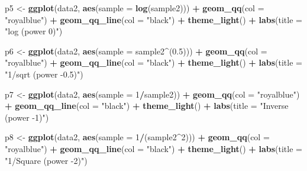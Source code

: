 \documentclass[
]{book}
\newenvironment{Shaded}{\begin{snugshade}}{\end{snugshade}}
\newcommand{\DataTypeTok}[1]{\textcolor[rgb]{0.13,0.29,0.53}{#1}}
\newcommand{\DecValTok}[1]{\textcolor[rgb]{0.00,0.00,0.81}{#1}}
\newcommand{\FloatTok}[1]{\textcolor[rgb]{0.00,0.00,0.81}{#1}}
\newcommand{\KeywordTok}[1]{\textcolor[rgb]{0.13,0.29,0.53}{\textbf{#1}}}
\newcommand{\NormalTok}[1]{#1}
\newcommand{\OperatorTok}[1]{\textcolor[rgb]{0.81,0.36,0.00}{\textbf{#1}}}
\newcommand{\StringTok}[1]{\textcolor[rgb]{0.31,0.60,0.02}{#1}}
\begin{document}
\begin{Shaded}
\begin{Highlighting}[]
\NormalTok{p5 <-}\StringTok{ }\KeywordTok{ggplot}\NormalTok{(data2, }\KeywordTok{aes}\NormalTok{(}\DataTypeTok{sample =} \KeywordTok{log}\NormalTok{(sample2))) }\OperatorTok{+}
\StringTok{    }\KeywordTok{geom_qq}\NormalTok{(}\DataTypeTok{col =} \StringTok{"royalblue"}\NormalTok{) }\OperatorTok{+}\StringTok{ }
\StringTok{    }\KeywordTok{geom_qq_line}\NormalTok{(}\DataTypeTok{col =} \StringTok{"black"}\NormalTok{) }\OperatorTok{+}
\StringTok{    }\KeywordTok{theme_light}\NormalTok{() }\OperatorTok{+}
\StringTok{    }\KeywordTok{labs}\NormalTok{(}\DataTypeTok{title =} \StringTok{"log (power 0)"}\NormalTok{)}

\NormalTok{p6 <-}\StringTok{ }\KeywordTok{ggplot}\NormalTok{(data2, }\KeywordTok{aes}\NormalTok{(}\DataTypeTok{sample =}\NormalTok{ sample2}\OperatorTok{^}\NormalTok{(}\FloatTok{0.5}\NormalTok{))) }\OperatorTok{+}
\StringTok{    }\KeywordTok{geom_qq}\NormalTok{(}\DataTypeTok{col =} \StringTok{"royalblue"}\NormalTok{) }\OperatorTok{+}\StringTok{ }
\StringTok{    }\KeywordTok{geom_qq_line}\NormalTok{(}\DataTypeTok{col =} \StringTok{"black"}\NormalTok{) }\OperatorTok{+}
\StringTok{    }\KeywordTok{theme_light}\NormalTok{() }\OperatorTok{+}
\StringTok{    }\KeywordTok{labs}\NormalTok{(}\DataTypeTok{title =} \StringTok{"1/sqrt (power -0.5)"}\NormalTok{)}

\NormalTok{p7 <-}\StringTok{ }\KeywordTok{ggplot}\NormalTok{(data2, }\KeywordTok{aes}\NormalTok{(}\DataTypeTok{sample =} \DecValTok{1}\OperatorTok{/}\NormalTok{sample2)) }\OperatorTok{+}
\StringTok{    }\KeywordTok{geom_qq}\NormalTok{(}\DataTypeTok{col =} \StringTok{"royalblue"}\NormalTok{) }\OperatorTok{+}\StringTok{ }
\StringTok{    }\KeywordTok{geom_qq_line}\NormalTok{(}\DataTypeTok{col =} \StringTok{"black"}\NormalTok{) }\OperatorTok{+}
\StringTok{    }\KeywordTok{theme_light}\NormalTok{() }\OperatorTok{+}
\StringTok{    }\KeywordTok{labs}\NormalTok{(}\DataTypeTok{title =} \StringTok{"Inverse (power -1)"}\NormalTok{)}

\NormalTok{p8 <-}\StringTok{ }\KeywordTok{ggplot}\NormalTok{(data2, }\KeywordTok{aes}\NormalTok{(}\DataTypeTok{sample =} \DecValTok{1}\OperatorTok{/}\NormalTok{(sample2}\OperatorTok{^}\DecValTok{2}\NormalTok{))) }\OperatorTok{+}
\StringTok{    }\KeywordTok{geom_qq}\NormalTok{(}\DataTypeTok{col =} \StringTok{"royalblue"}\NormalTok{) }\OperatorTok{+}\StringTok{ }
\StringTok{    }\KeywordTok{geom_qq_line}\NormalTok{(}\DataTypeTok{col =} \StringTok{"black"}\NormalTok{) }\OperatorTok{+}
\StringTok{    }\KeywordTok{theme_light}\NormalTok{() }\OperatorTok{+}
\StringTok{    }\KeywordTok{labs}\NormalTok{(}\DataTypeTok{title =} \StringTok{"1/Square (power -2)"}\NormalTok{)}


\end{Highlighting}
\end{Shaded}
\end{document}

